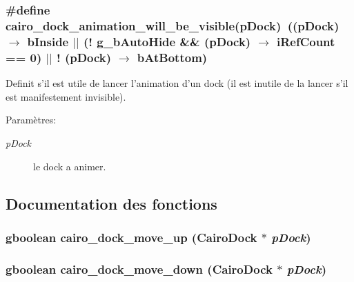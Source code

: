 \subsubsection{\setlength{\rightskip}{0pt plus 5cm}\#define cairo\_\-dock\_\-animation\_\-will\_\-be\_\-visible(pDock)~((pDock) $\rightarrow$ bInside $|$$|$ (! {\bf g\_\-bAutoHide} \&\& (pDock) $\rightarrow$ iRefCount == 0) $|$$|$ ! (pDock) $\rightarrow$ bAtBottom)}\label{cairo-dock-animations_8h_c23808bba4ecd5ddb4ef803a4e2e39c5}


Definit s'il est utile de lancer l'animation d'un dock (il est inutile de la lancer s'il est manifestement invisible). \begin{Desc}
\item[Paramètres:]
\begin{description}
\item[{\em pDock}]le dock a animer. \end{description}
\end{Desc}


\subsection{Documentation des fonctions}
\subsubsection{\setlength{\rightskip}{0pt plus 5cm}gboolean cairo\_\-dock\_\-move\_\-up ({\bf CairoDock} $\ast$ {\em pDock})}\label{cairo-dock-animations_8h_dbdf2df4bca3c8693babeda5fba8b110}


\subsubsection{\setlength{\rightskip}{0pt plus 5cm}gboolean cairo\_\-dock\_\-move\_\-down ({\bf CairoDock} $\ast$ {\em pDock})}\label{cairo-dock-animations_8h_0ceefbf48eaf88fbcde2fc204f91c82d}


